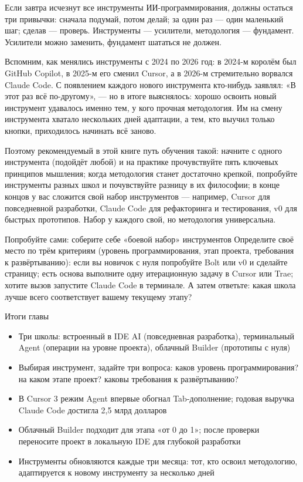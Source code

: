 
Если завтра исчезнут все инструменты ИИ-программирования, должны остаться три привычки: сначала подумай, потом делай; за один раз — один маленький шаг; сделав — проверь. Инструменты — усилители, методология — фундамент. Усилители можно заменить, фундамент шататься не должен.

Вспомним, как менялись инструменты с 2024 по 2026 год: в 2024-м королём был GitHub Copilot, в 2025-м его сменил Cursor, а в 2026-м стремительно ворвался Claude Code. С появлением каждого нового инструмента кто-нибудь заявлял: «В этот раз всё по-другому», — но в итоге выяснялось: хорошо освоить новый инструмент удавалось именно тем, у кого прочная методология. Им на смену инструмента хватало нескольких дней адаптации, а тем, кто выучил только кнопки, приходилось начинать всё заново.

Поэтому рекомендуемый в этой книге путь обучения такой: начните с одного инструмента (подойдёт любой) и на практике прочувствуйте пять ключевых принципов мышления; когда методология станет достаточно крепкой, попробуйте инструменты разных школ и почувствуйте разницу в их философии; в конце концов у вас сложится свой набор инструментов — например, Cursor для повседневной разработки, Claude Code для рефакторинга и тестирования, v0 для быстрых прототипов. Набор у каждого свой, но методология универсальна.

\begin{tcbpractice}{Попробуйте сами: соберите себе «боевой набор» инструментов}
Определите своё место по трём критериям (уровень программирования, этап проекта, требования к развёртыванию): если вы новичок с нуля попробуйте Bolt или v0 и сделайте страницу; есть основа выполните одну итерационную задачу в Cursor или Trae; хотите вызов запустите Claude Code в терминале. А затем ответьте: какая школа лучше всего соответствует вашему текущему этапу?

\end{tcbpractice}

\begin{tcbsummary}{Итоги главы}
\begin{itemize}
  \item Три школы: встроенный в IDE AI (повседневная разработка), терминальный Agent (операции на уровне проекта), облачный Builder (прототипы с нуля)
  \item Выбирая инструмент, задайте три вопроса: каков уровень программирования? на каком этапе проект? каковы требования к развёртыванию?
  \item В Cursor 3 режим Agent впервые обогнал Tab-дополнение; годовая выручка Claude Code достигла 2,5 млрд долларов
  \item Облачный Builder подходит для этапа «от 0 до 1»; после проверки переносите проект в локальную IDE для глубокой разработки
  \item Инструменты обновляются каждые три месяца: тот, кто освоил методологию, адаптируется к новому инструменту за несколько дней
\end{itemize}

\end{tcbsummary}
